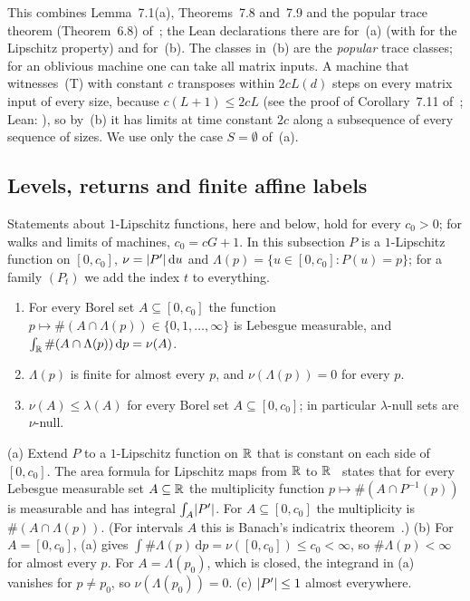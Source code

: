 This combines Lemma~7.1(a), Theorems~7.8 and~7.9 and the popular trace theorem (Theorem~6.8) of~\cite{FirstPaper2026};
the Lean declarations there are  for~(a) (with
 for the Lipschitz property) and
 for~(b). The classes in~(b) are the \emph{popular} trace classes;
for an oblivious machine one can take all matrix inputs. A machine that witnesses~(T) with constant $c$ transposes
within $2cL(d)$ steps on every matrix input of every size, because $c(L+1)\le2cL$ (see the proof of Corollary~7.11
of~\cite{FirstPaper2026}; Lean: ), so by~(b) it has limits at time
constant $2c$ along a subsequence of every sequence of sizes. We use only the case $S=\emptyset$ of~(a).

\subsection{Levels, returns and finite affine labels}\label{sec:mot-tools}

Statements about $1$-Lipschitz functions, here and below, hold for every $c_0>0$; for walks and limits of machines,
$c_0=cG+1$. In this subsection $P$ is a $1$-Lipschitz function on $[0,c_0]$, $\nu=\lvert P' \rvert\,\mathrm du$ and
$\Lambda(p)=\{u\in[0,c_0]:P(u)=p\}$; for a family $(P_t)$ we add the index $t$ to everything.

\begin{lemma}[Levels]\label{lem:mot-levels}
\notformalized
\begin{enumerate}[label=(\alph*)]
\item For every Borel set $A\subseteq[0,c_0]$ the function $p\mapsto\#(A\cap\Lambda(p))\in\{0,1,\dots,\infty\}$ is
Lebesgue measurable, and $\int_{\mathbb{R}}\#(A\cap\Lambda(p))\,\mathrm dp=\nu(A)$.
\item $\Lambda(p)$ is finite for almost every $p$, and $\nu(\Lambda(p))=0$ for every $p$.
\item $\nu(A)\le\lambda(A)$ for every Borel set $A\subseteq[0,c_0]$; in particular $\lambda$-null sets are $\nu$-null.
\end{enumerate}
\end{lemma}

\begin{informalproof}
(a) Extend $P$ to a $1$-Lipschitz function on $\mathbb{R}$ that is constant on each side of $[0,c_0]$. The area formula for
Lipschitz maps from $\mathbb{R}$ to $\mathbb{R}$~\cite[Theorem~3.2.3]{Federer1969} states that for every Lebesgue measurable set
$A\subseteq\mathbb{R}$ the multiplicity function $p\mapsto\#(A\cap P^{-1}(p))$ is measurable and has integral $\int_A\lvert P' \rvert$.
For $A\subseteq[0,c_0]$ the multiplicity is $\#(A\cap\Lambda(p))$. (For intervals $A$ this is Banach's indicatrix
theorem~\cite{Banach1925}.)
(b) For $A=[0,c_0]$, (a) gives $\int\#\Lambda(p)\,\mathrm dp=\nu([0,c_0])\le c_0<\infty$, so $\#\Lambda(p)<\infty$ for
almost every $p$. For $A=\Lambda(p_0)$, which is closed, the integrand in (a) vanishes for $p\ne p_0$, so
$\nu(\Lambda(p_0))=0$.
(c) $\lvert P' \rvert\le1$ almost everywhere.
\end{informalproof}

